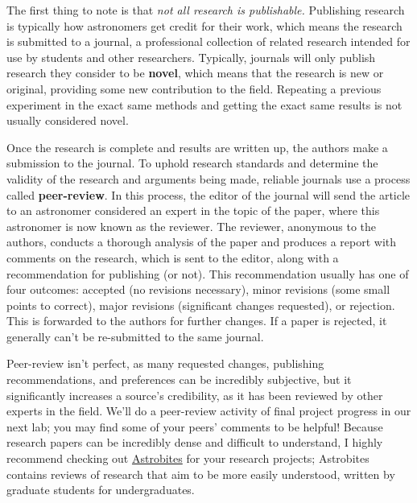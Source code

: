 \documentclass[11pt]{article}%
\begin{document}
\medskip

The first thing to note is that \textit{not all research is publishable.} Publishing research is typically how astronomers get credit for their work, which means the research is submitted to a journal, a professional collection of related research intended for use by students and other researchers. Typically, journals will only publish research they consider to be \textbf{novel}, which means that the research is new or original, providing some new contribution to the field. Repeating a previous experiment in the exact same methods and getting the exact same results is not usually considered novel.

\medskip

Once the research is complete and results are written up, the authors make a submission to the journal. To uphold research standards and determine the validity of the research and arguments being made, reliable journals use a process called \textbf{peer-review}. In this process, the editor of the journal will send the article to an astronomer considered an expert in the topic of the paper, where this astronomer is now known as the reviewer. The reviewer, anonymous to the authors, conducts a thorough analysis of the paper and produces a report with comments on the research, which is sent to the editor, along with a recommendation for publishing (or not). This recommendation usually has one of four outcomes: accepted (no revisions necessary), minor revisions (some small points to correct), major revisions (significant changes requested), or rejection. This is forwarded to the authors for further changes. If a paper is rejected, it generally can't be re-submitted to the same journal. 

\medskip

Peer-review isn't perfect, as many requested changes, publishing recommendations, and preferences can be incredibly subjective, but it significantly increases a source's credibility, as it has been reviewed by other experts in the field. We'll do a peer-review activity of final project progress in our next lab; you may find some of your peers' comments to be helpful! Because research papers can be incredibly dense and difficult to understand, I highly recommend checking out \href{https://astrobites.org/category/daily-paper-summaries/}{Astrobites} for your research projects; Astrobites contains reviews of research that aim to be more easily understood, written by graduate students for undergraduates.
\end{document}
